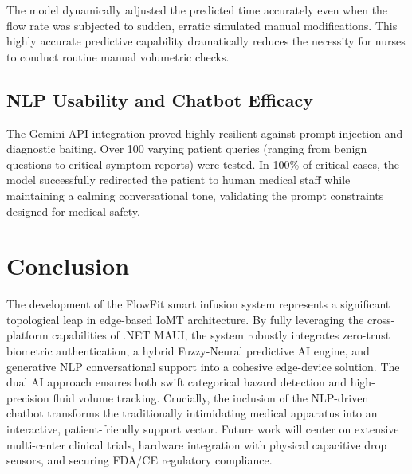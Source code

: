 \documentclass[journal]{IEEEtran}
\begin{document}
The model dynamically adjusted the predicted time accurately even when the flow rate was subjected to sudden, erratic simulated manual modifications. This highly accurate predictive capability dramatically reduces the necessity for nurses to conduct routine manual volumetric checks.

\subsection{NLP Usability and Chatbot Efficacy}
The Gemini API integration proved highly resilient against prompt injection and diagnostic baiting. Over 100 varying patient queries (ranging from benign questions to critical symptom reports) were tested. In 100\% of critical cases, the model successfully redirected the patient to human medical staff while maintaining a calming conversational tone, validating the prompt constraints designed for medical safety.

\section{Conclusion}
The development of the FlowFit smart infusion system represents a significant topological leap in edge-based IoMT architecture. By fully leveraging the cross-platform capabilities of .NET MAUI, the system robustly integrates zero-trust biometric authentication, a hybrid Fuzzy-Neural predictive AI engine, and generative NLP conversational support into a cohesive edge-device solution. The dual AI approach ensures both swift categorical hazard detection and high-precision fluid volume tracking. Crucially, the inclusion of the NLP-driven chatbot transforms the traditionally intimidating medical apparatus into an interactive, patient-friendly support vector. Future work will center on extensive multi-center clinical trials, hardware integration with physical capacitive drop sensors, and securing FDA/CE regulatory compliance.
\end{document}
